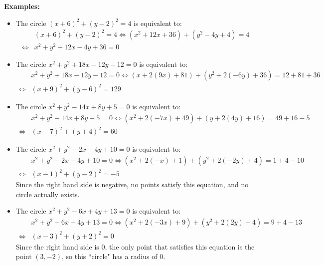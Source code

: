 \documentclass{article}
\begin{document}
\textbf{Examples:}
\begin{itemize}
\item The circle \((x + 6)^2 + (y - 2)^2 = 4\) is equivalent to:
\begin{align*}
& (x + 6)^2 + (y - 2)^2 = 4 
\iff (x^2 + 12x + 36) + (y^2 - 4y + 4) = 4 \\
\iff & x^2 + y^2 + 12x - 4y + 36 = 0
\end{align*}
\item The circle \(x^2 + y^2 + 18x - 12y - 12 = 0\) is equivalent to:
\begin{align*}
& x^2 + y^2 + 18x - 12y - 12 = 0 
\iff (x + 2(9x) + 81) + (y^2 + 2(-6y) + 36) = 12 + 81 + 36 \\
\iff & (x + 9)^2 + (y - 6)^2 = 129
\end{align*}
\item The circle \(x^2 + y^2 - 14x + 8y + 5 = 0\) is equivalent to:
\begin{align*}
& x^2 + y^2 - 14x + 8y + 5 = 0 
\iff (x^2 + 2(-7x) + 49) + (y + 2(4y) + 16) = 49 + 16 - 5 \\
\iff & (x - 7)^2 + (y + 4)^2 = 60
\end{align*}
\item The circle \(x^2 + y^2 - 2x - 4y + 10 = 0\) is equivalent to:
\begin{align*}
& x^2 + y^2 - 2x - 4y + 10 = 0
\iff (x^2 + 2(-x) + 1) + (y^2 + 2(-2y) + 4) = 1 + 4 - 10 \\
\iff & (x - 1)^2 + (y - 2)^2 = -5
\end{align*}
Since the right hand side is negative, no points satisfy this equation, and no circle actually exists.
\item The circle \(x^2 + y^2 - 6x + 4y + 13 = 0\) is equivalent to:
\begin{align*}
& x^2 + y^2 - 6x + 4y + 13 = 0 
\iff (x^2 + 2(-3x) + 9) + (y^2 + 2(2y) + 4) = 9 + 4 - 13 \\
\iff & (x - 3)^2 + (y + 2)^2 = 0
\end{align*}
Since the right hand side is \(0\), the only point that satisfies this equation is the point \((3,-2)\), so this ``circle" has a radius of \(0\).
\end{itemize}
\end{document}
